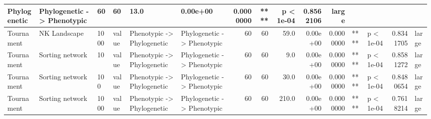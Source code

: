 \documentclass[]{book}
\begin{document}
\begin{table}
\begin{tabular}[t]{l|l|l|l|l|l|r|r|r|r|r|l|l|r|l}
Phylogenetic & Phylogenetic
    ->
Phenotypic & 60 & 60 & 13.0 & 0.00e+00 & 0.0000000 & **** & p < 1e-04 & 0.8562106 & large\\
\hline
Tournament & NK Landscape & 1000 & value & Phenotypic
    ->
Phylogenetic & Phylogenetic
    ->
Phenotypic & 60 & 60 & 59.0 & 0.00e+00 & 0.0000000 & **** & p < 1e-04 & 0.8341705 & large\\
\hline
Tournament & Sorting network & 10 & value & Phenotypic
    ->
Phylogenetic & Phylogenetic
    ->
Phenotypic & 60 & 60 & 9.0 & 0.00e+00 & 0.0000000 & **** & p < 1e-04 & 0.8581272 & large\\
\hline
Tournament & Sorting network & 100 & value & Phenotypic
    ->
Phylogenetic & Phylogenetic
    ->
Phenotypic & 60 & 60 & 30.0 & 0.00e+00 & 0.0000000 & **** & p < 1e-04 & 0.8480654 & large\\
\hline
Tournament & Sorting network & 1000 & value & Phenotypic
    ->
Phylogenetic & Phylogenetic
    ->
Phenotypic & 60 & 60 & 210.0 & 0.00e+00 & 0.0000000 & **** & p < 1e-04 & 0.7618214 & large\\
\hline
\end{tabular}
\end{table}


\end{document}
